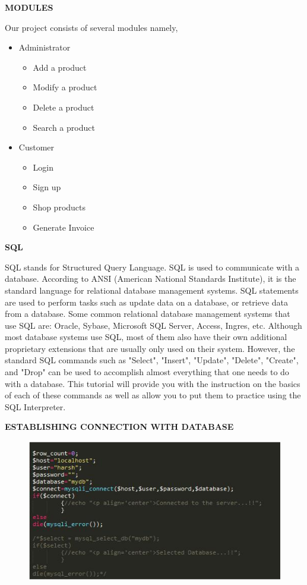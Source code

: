 \documentclass{tcc}
\begin{document}
\begin{center}
\textbf{\Large{MODULES}}
\end{center}
Our project consists of several modules namely,
\begin{itemize}
    \item Administrator
    \begin{itemize}
        \item Add a product
        \item Modify a product
        \item Delete a product
        \item Search a product
    \end{itemize}
    \newpage
    \item Customer
    \begin{itemize}
        \item Login
        \item Sign up
        \item Shop products
        \item Generate Invoice
    \end{itemize}
\end{itemize}
\begin{center}
\textbf{\Large{SQL}}
\end{center}
SQL stands for Structured Query Language. SQL is used to communicate with a database. According to ANSI (American National Standards Institute), it is the standard language for relational database management systems. SQL statements are used to perform tasks such as update data on a database, or retrieve data from a database. Some common relational database management systems that use SQL are: Oracle, Sybase, Microsoft SQL Server, Access, Ingres, etc. Although most database systems use SQL, most of them also have their own additional proprietary extensions that are usually only used on their system. However, the standard SQL commands such as "Select", "Insert", "Update", "Delete", "Create", and "Drop" can be used to accomplish almost everything that one needs to do with a database. This tutorial will provide you with the instruction on the basics of each of these commands as well as allow you to put them to practice using the SQL Interpreter.
\begin{center}
\textbf{\Large{ESTABLISHING CONNECTION WITH DATABASE}}
\end{center}
\begin{figure}[H]
\centering
\includegraphics{images/1.PNG}\\
\end{figure}
\end{document}
